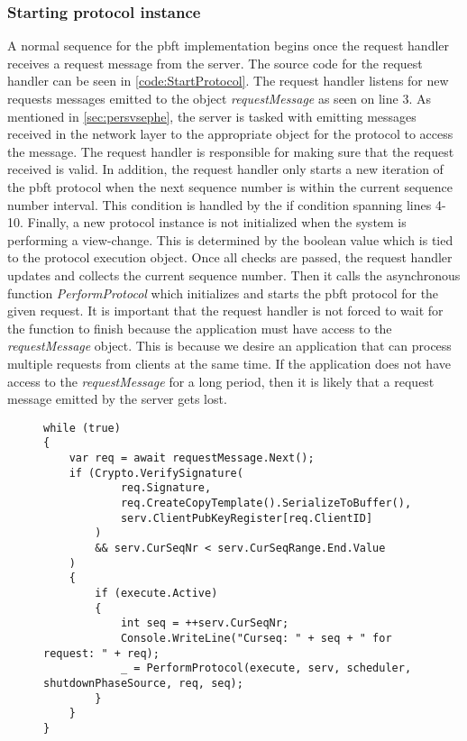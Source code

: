 \subsubsection{Starting protocol instance}
A normal sequence for the \ac{pbft} implementation begins once the request handler receives a request message from the server. The source code for the request handler can be seen in \autoref{code:StartProtocol}. The request handler listens for new requests messages emitted to the  object \emph{requestMessage} as seen on line 3. As mentioned in \autoref{sec:persvsephe}, the server is tasked with emitting messages received in the network layer to the appropriate  object for the protocol to access the message. The request handler is responsible for making sure that the request received is valid. In addition, the request handler only starts a new iteration of the \ac{pbft} protocol when the next sequence number is within the current sequence number interval. This condition is handled by the if condition spanning lines 4-10. Finally, a new protocol instance is not initialized when the system is performing a view-change. This is determined by the boolean value  which is tied to the protocol execution object. Once all checks are passed, the request handler updates and collects the current sequence number. Then it calls the asynchronous  function \emph{PerformProtocol} which initializes and starts the \ac{pbft} protocol for the given request. It is important that the request handler is not forced to wait for the  function to finish because the application must have access to the \emph{requestMessage}  object. This is because we desire an application that can process multiple requests from clients at the same time. If the application does not have access to the \emph{requestMessage} for a long period, then it is likely that a request message emitted by the server gets lost.

\begin{figure}[H]
	\centering
	\begin{lstlisting}[label = code:StartProtocol, caption=Code section from the request handler, captionpos = b, basicstyle=\scriptsize]
while (true)
{
    var req = await requestMessage.Next();
    if (Crypto.VerifySignature(
            req.Signature, 
            req.CreateCopyTemplate().SerializeToBuffer(), 
            serv.ClientPubKeyRegister[req.ClientID]
        ) 
        && serv.CurSeqNr < serv.CurSeqRange.End.Value
    )
    {
        if (execute.Active)
        {
            int seq = ++serv.CurSeqNr;
            Console.WriteLine("Curseq: " + seq + " for request: " + req);
            _ = PerformProtocol(execute, serv, scheduler, shutdownPhaseSource, req, seq);
        }
    }
}
	\end{lstlisting}
\end{figure}


